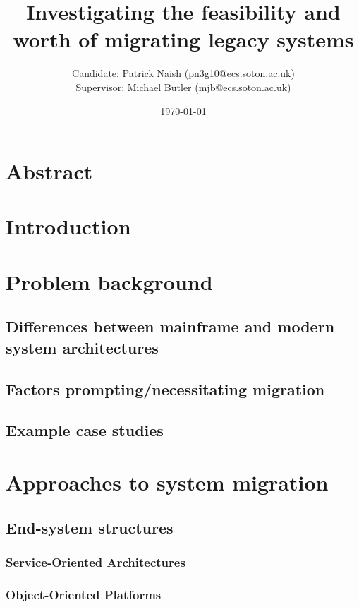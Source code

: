 \documentclass[a4paper,10pt]{article}
\title{Investigating the feasibility and worth of migrating legacy systems}
\date{\today}
\author{Candidate: Patrick Naish (pn3g10@ecs.soton.ac.uk)\\Supervisor: Michael Butler (mjb@ecs.soton.ac.uk)}
\begin{document}
\maketitle

\section*{Abstract}

\section{Introduction}

\section{Problem background}

\subsection{Differences between mainframe and modern system architectures}

\subsection{Factors prompting/necessitating migration}

\subsection{Example case studies}

\section{Approaches to system migration}

\subsection{End-system structures}

\subsubsection{Service-Oriented Architectures}

\subsubsection{Object-Oriented Platforms}
\end{document}
